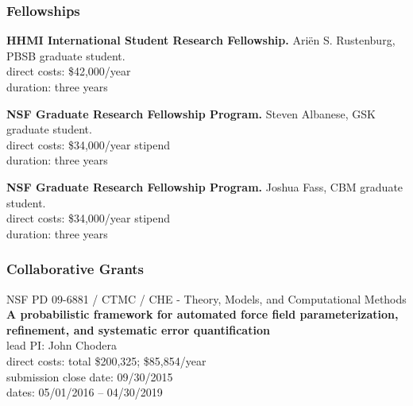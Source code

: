 \documentclass[10pt]{article}
\begin{document}
\subsubsection*{Fellowships}

%

{\bf HHMI International Student Research Fellowship.} Ari\"{e}n S. Rustenburg, PBSB graduate student.\\
direct costs: \$42,000/year\\
duration: three years

\vspace{2ex}

{\bf NSF Graduate Research Fellowship Program.}  Steven Albanese, GSK graduate student.\\
direct costs: \$34,000/year stipend\\
duration: three years

\vspace{2ex}

{\bf NSF Graduate Research Fellowship Program.}  Joshua Fass, CBM graduate student.\\
direct costs: \$34,000/year stipend\\
duration: three years




\subsubsection*{Collaborative Grants}

NSF PD 09-6881 / CTMC / CHE - Theory, Models, and Computational Methods\\
{\bf A probabilistic framework for automated force field parameterization, refinement, and systematic error quantification}\\
lead PI: John Chodera\\
direct costs: total \$200,325; \$85,854/year\\
submission close date: 09/30/2015\\
dates: 05/01/2016 -- 04/30/2019
\end{document}
